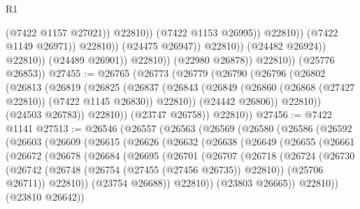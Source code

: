 \begin{lexlean}{R1}
\begin{coremodule}
                                                (@7422 @1157 @27021))
                                              @22810))
                                          (@7422 @1153 @26995))
                                        @22810))
                                    (@7422 @1149 @26971))
                                  @22810))
                              (@24475 @26947))
                            @22810))
                        (@24482 @26924))
                      @22810))
                  (@24489 @26901))
                @22810))
            (@22980 @26878))
          @22810))
      (@25776 @26853))
@27455 := @26765
    (@26773
      (@26779
        (@26790
          (@26796
            (@26802
              (@26813
                (@26819
                  (@26825
                    (@26837
                      (@26843
                        (@26849 (@26860 (@26868 (@27427 @22810)) (@7422 @1145 @26830)) @22810))
                      (@24442 @26806))
                    @22810))
                (@24503 @26783))
              @22810))
          (@23747 @26758))
        @22810))
@27456 := @7422 @1141
@27513 := @26546
    (@26557
      (@26563
        (@26569
          (@26580
            (@26586
              (@26592
                (@26603
                  (@26609
                    (@26615
                      (@26626
                        (@26632
                          (@26638
                            (@26649
                              (@26655
                                (@26661
                                  (@26672
                                    (@26678
                                      (@26684
                                        (@26695
                                          (@26701
                                            (@26707
                                              (@26718
                                                (@26724
                                                  (@26730
                                                    (@26742
                                                      (@26748
                                                        (@26754 (@27455 (@27456 @26735)) @22810))
                                                      (@25706 @26711))
                                                    @22810))
                                                (@23754 @26688))
                                              @22810))
                                          (@23803 @26665))
                                        @22810))
                                    (@23810 @26642))

\end{coremodule}
\end{lexlean}
